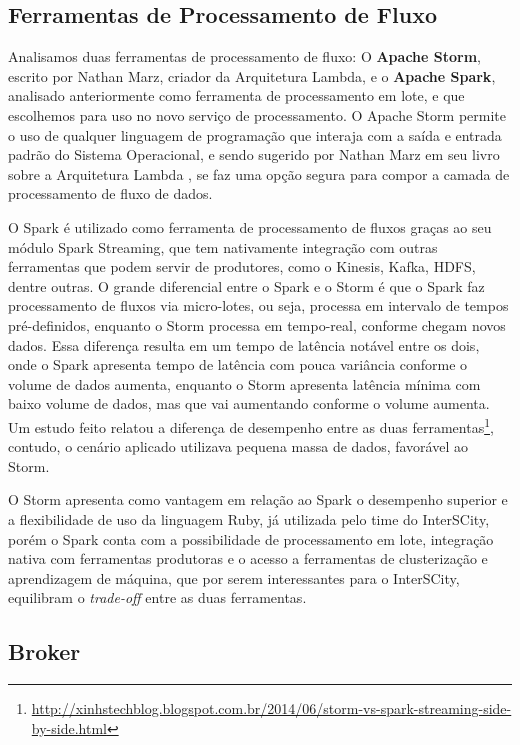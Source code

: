 
\subsection{Ferramentas de Processamento de Fluxo}

Analisamos duas ferramentas de processamento de fluxo: O
\textbf{Apache Storm}, escrito por Nathan Marz, criador da Arquitetura
Lambda, e o \textbf{Apache Spark}, analisado anteriormente como ferramenta de
processamento em lote, e que escolhemos para uso no novo serviço de
processamento. O Apache Storm permite o uso de qualquer
linguagem de programação que interaja com a saída e entrada padrão do Sistema
Operacional, e sendo sugerido por Nathan Marz em seu livro sobre a Arquitetura
Lambda \cite{marz2015}, se faz uma opção segura para compor a camada
de processamento de fluxo de dados.

O Spark é utilizado como ferramenta de processamento de fluxos graças ao seu módulo
Spark Streaming, que tem nativamente integração com outras ferramentas que
podem servir de produtores, como o Kinesis, Kafka, HDFS, dentre outras. O
grande diferencial entre o Spark e o Storm é que o Spark faz processamento
de fluxos via micro-lotes, ou seja, processa em intervalo
de tempos pré-definidos, enquanto o Storm processa em tempo-real, conforme
chegam novos dados. Essa diferença resulta em um tempo de latência notável
entre os dois, onde o Spark apresenta tempo de latência com pouca variância
conforme o volume de dados aumenta, enquanto o Storm apresenta latência mínima
com baixo volume de dados, mas que vai aumentando conforme o volume aumenta.
Um estudo feito relatou a diferença de desempenho entre as duas
ferramentas\footnote{\url{http://xinhstechblog.blogspot.com.br/2014/06/storm-vs-spark-streaming-side-by-side.html}},
contudo, o cenário aplicado utilizava pequena massa de dados, favorável ao
Storm.

O Storm apresenta como vantagem em relação ao Spark o desempenho
superior e a flexibilidade de uso da linguagem Ruby, já utilizada pelo time
do InterSCity, porém o Spark conta com a possibilidade de processamento
em lote, integração nativa com ferramentas produtoras e o acesso a
ferramentas de clusterização e aprendizagem de máquina, que por serem
interessantes para o InterSCity, equilibram o \textit{trade-off} entre as
duas ferramentas.

\subsection{Broker}

